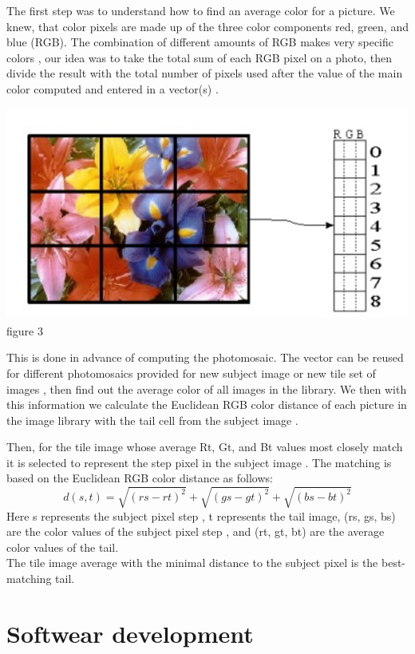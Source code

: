 \documentclass[a4paper,12pt]{report}
\begin{document}
	The first step was to understand how to find an average color for a picture. We knew, that color pixels are made up of the three color components red, green, and blue (RGB). The combination of different amounts of RGB makes very specific colors , our idea was to take the total sum of each RGB pixel on a photo, then divide the result with the total number of pixels used after the value of the main color computed and entered in a vector(s) .\\
	\begin{center}
		\includegraphics[width=15cm, height=7cm, 
		keepaspectratio]{Untitled}
		{figure 3}
	\end{center}
	 This is done in advance of computing the photomosaic. The vector can be reused for different photomosaics provided for new subject image or new tile set of images , then find out the average color of all images in the library. We then with this information we calculate the Euclidean RGB color distance  of each picture in the image library with the tail cell from the subject image .
	
	Then, for the tile image whose average Rt, Gt, and Bt
	values most closely match it is selected to represent the step pixel in the subject image . The matching is based on
	the Euclidean RGB color distance as follows:
	$$	d(s, t) =  \sqrt{(rs-rt)^2} + \sqrt{(gs-gt)^2}  + \sqrt{(bs-bt)^2} $$
	Here s represents the subject pixel step , t represents the tail image, (rs, gs, bs) are the color values
	of the subject pixel step , and (rt, gt, bt) are the average color values of the tail. \\
	The tile image average with the minimal distance to the subject pixel is the best-matching tail\cite{MIT}.
	
	
	\chapter{Softwear development}
	
\end{document}
